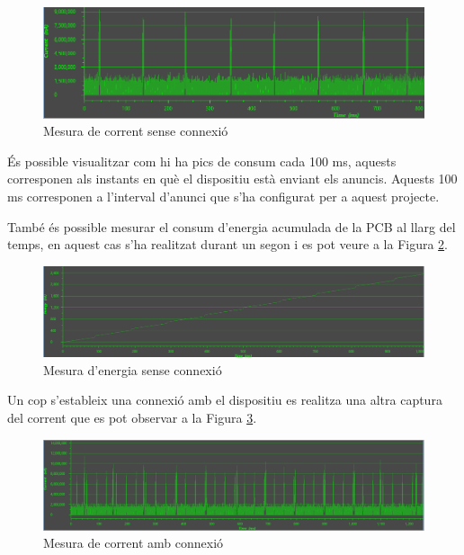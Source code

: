 \begin{figure}[!h]
	\begin{center}
		\includegraphics[width=\textwidth]{./images/consum_energia_no_connected_current2.png}
		\caption{Mesura de corrent sense connexió}
		\label{energy_trace1}
	\end{center}
\end{figure}

És possible visualitzar com hi ha pics de consum cada 100 ms, aquests corresponen als instants en què el dispositiu està enviant els anuncis.
Aquests 100 ms corresponen a l'interval d'anunci que s'ha configurat per a aquest projecte.

També és possible mesurar el consum d'energia acumulada de la PCB al llarg del temps, en aquest cas s'ha realitzat durant un segon i es pot veure a la Figura \ref{energy_measure}.

\begin{figure}[!h]
	\begin{center}
		\includegraphics[width=\textwidth]{./images/consum_energia_no_connected_energia.PNG}
		\caption{Mesura d'energia sense connexió}
		\label{energy_measure}
	\end{center}
\end{figure}

Un cop s'estableix una connexió amb el dispositiu es realitza una altra captura del corrent que es pot observar a la Figura \ref{energy_trace_connection}.

\begin{figure}[!h]
	\begin{center}
		\includegraphics[width=\textwidth]{./images/consum_energia_connected_current.png}
		\caption{Mesura de corrent amb connexió}
		\label{energy_trace_connection}
	\end{center}
\end{figure}

